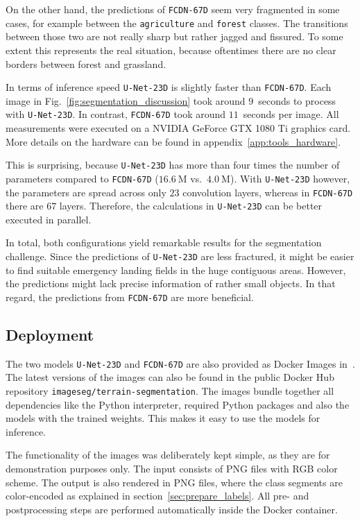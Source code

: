 On the other hand, the predictions of \texttt{FCDN-67D} seem very fragmented in some cases, for example between the \texttt{agriculture} and \texttt{forest} classes. The transitions between those two are not really sharp but rather jagged and fissured. To some extent this represents the real situation, because oftentimes there are no clear borders between forest and grassland.

In terms of inference speed \texttt{U-Net-23D} is slightly faster than \texttt{FCDN-67D}. Each image in Fig.~\ref{fig:segmentation_discussion} took around $9$~seconds to process with \texttt{U-Net-23D}. In contrast, \texttt{FCDN-67D} took around $11$~seconds per image. All measurements were executed on a NVIDIA GeForce GTX 1080 Ti graphics card. More details on the hardware can be found in appendix~\ref{app:tools_hardware}.

This is surprising, because \texttt{U-Net-23D} has more than four times the number of parameters compared to \texttt{FCDN-67D} ($16.6~\text{M}$ vs.\ $4.0~\text{M}$). With \texttt{U-Net-23D} however, the parameters are spread across only $23$ convolution layers, whereas in \texttt{FCDN-67D} there are $67$ layers. Therefore, the calculations in \texttt{U-Net-23D} can be better executed in parallel.

In total, both configurations yield remarkable results for the segmentation challenge. Since the predictions of \texttt{U-Net-23D} are less fractured, it might be easier to find suitable emergency landing fields in the huge contiguous areas. However, the predictions might lack precise information of rather small objects. In that regard, the predictions from \texttt{FCDN-67D} are more beneficial.

\subsection{Deployment}
The two models \texttt{U-Net-23D} and \texttt{FCDN-67D} are also provided as Docker Images in~\cite{thesis-code20}. The latest versions of the images can also be found in the public Docker Hub repository \texttt{imageseg/terrain-segmentation}. The images bundle together all dependencies like the Python interpreter, required Python packages and also the models with the trained weights. This makes it easy to use the models for inference.

The functionality of the images was deliberately kept simple, as they are for demonstration purposes only. The input consists of PNG files with RGB color scheme. The output is also rendered in PNG files, where the class segments are color-encoded as explained in section~\ref{sec:prepare_labels}. All pre- and postprocessing steps are performed automatically inside the Docker container.

